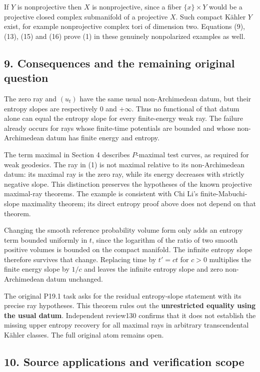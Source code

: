 \documentclass[
]{article}
\begin{document}
If \(Y\) is nonprojective then \(X\) is nonprojective, since a fiber
\(\{x\}\times Y\) would be a projective closed complex submanifold of a
projective \(X\). Such compact Kähler \(Y\) exist, for example
nonprojective complex tori of dimension two. Equations (9), (13), (15)
and (16) prove (1) in these genuinely nonpolarized examples as well.

\subsection{9. Consequences and the remaining original
question}\label{consequences-and-the-remaining-original-question}

The zero ray and \((u_t)\) have the same usual non-Archimedean datum,
but their entropy slopes are respectively \(0\) and \(+\infty\). Thus no
functional of that datum alone can equal the entropy slope for every
finite-energy weak ray. The failure already occurs for rays whose
finite-time potentials are bounded and whose non-Archimedean datum has
finite energy and entropy.

The term maximal in Section 4 describes \(P\)-maximal test curves, as
required for weak geodesics. The ray in (1) is not maximal relative to
its non-Archimedean datum: its maximal ray is the zero ray, while its
energy decreases with strictly negative slope. This distinction
preserves the hypotheses of the known projective maximal-ray theorems.
The example is consistent with Chi Li's finite-Mabuchi-slope maximality
theorem; its direct entropy proof above does not depend on that theorem.

Changing the smooth reference probability volume form only adds an
entropy term bounded uniformly in \(t\), since the logarithm of the
ratio of two smooth positive volumes is bounded on the compact manifold.
The infinite entropy slope therefore survives that change. Replacing
time by \(t' = c t\) for \(c>0\) multiplies the finite energy slope by
\(1/c\) and leaves the infinite entropy slope and zero non-Archimedean
datum unchanged.

The original P19.1 task asks for the residual entropy-slope statement
with its precise ray hypotheses. This theorem rules out the
\textbf{unrestricted equality using the usual datum}. Independent
review130 confirms that it does not establish the missing upper entropy
recovery for all maximal rays in arbitrary transcendental Kähler
classes. The full original atom remains open.

\subsection{10. Source applications and verification
scope}\label{source-applications-and-verification-scope}
\end{document}
